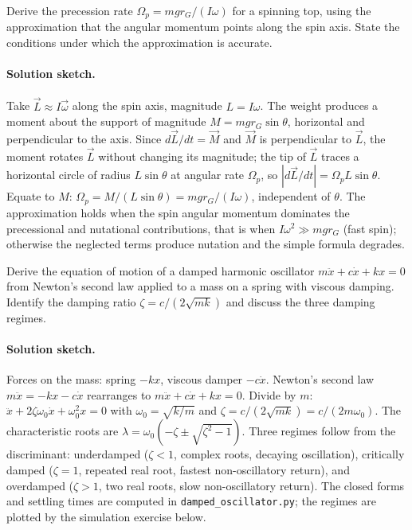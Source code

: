 \begin{exercise}
Derive the precession rate $\Omega_p = mgr_G/(I\omega)$ for a
spinning top, using the approximation that the angular momentum
points along the spin axis. State the conditions under which the
approximation is accurate.
\paragraph{Solution sketch.} Take $\vec{L}\approx I\vec{\omega}$ along
the spin axis, magnitude $L=I\omega$. The weight produces a moment
about the support of magnitude $M=mgr_{G}\sin\theta$, horizontal and
perpendicular to the axis. Since $d\vec{L}/dt=\vec{M}$ and $\vec{M}$ is
perpendicular to $\vec{L}$, the moment rotates $\vec{L}$ without
changing its magnitude; the tip of $\vec{L}$ traces a horizontal
circle of radius $L\sin\theta$ at angular rate $\Omega_{p}$, so
$|d\vec{L}/dt|=\Omega_{p}L\sin\theta$. Equate to $M$:
$\Omega_{p}=M/(L\sin\theta)=mgr_{G}/(I\omega)$, independent of
$\theta$. The approximation holds when the spin angular momentum
dominates the precessional and nutational contributions, that is when
$I\omega^{2}\gg mgr_{G}$ (fast spin); otherwise the neglected terms
produce nutation and the simple formula degrades.
\end{exercise}

\begin{exercise}
Derive the equation of motion of a damped harmonic oscillator
$m\ddot{x} + c\dot{x} + kx = 0$ from Newton's second law applied to a
mass on a spring with viscous damping. Identify the damping ratio
$\zeta = c/(2\sqrt{mk})$ and discuss the three damping regimes.
\paragraph{Solution sketch.} Forces on the mass: spring $-kx$, viscous
damper $-c\dot{x}$. Newton's second law $m\ddot{x}=-kx-c\dot{x}$
rearranges to $m\ddot{x}+c\dot{x}+kx=0$. Divide by $m$:
$\ddot{x}+2\zeta\omega_{0}\dot{x}+\omega_{0}^{2}x=0$ with
$\omega_{0}=\sqrt{k/m}$ and $\zeta=c/(2\sqrt{mk})=c/(2m\omega_{0})$.
The characteristic roots are $\lambda=\omega_{0}(-\zeta\pm\sqrt{\zeta^{2}
-1})$. Three regimes follow from the discriminant: underdamped
($\zeta<1$, complex roots, decaying oscillation), critically damped
($\zeta=1$, repeated real root, fastest non-oscillatory return), and
overdamped ($\zeta>1$, two real roots, slow non-oscillatory return).
The closed forms and settling times are computed in
\texttt{damped\_oscillator.py}; the regimes are plotted by the
simulation exercise below.
\end{exercise}

